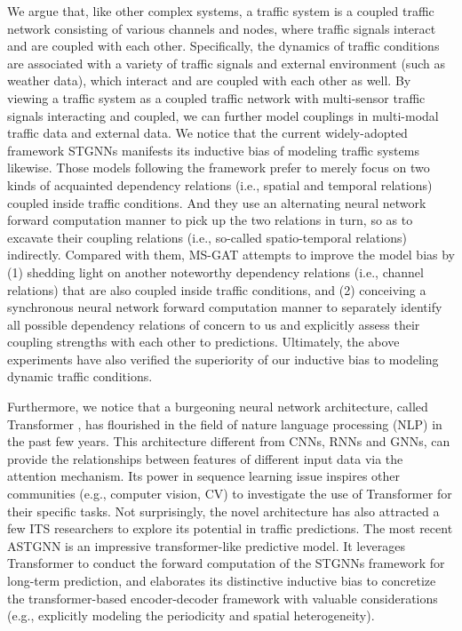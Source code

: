We argue that, like other complex systems, a traffic system is a coupled traffic network consisting of various channels and nodes, where traffic signals interact and are coupled with each other. Specifically, the dynamics of traffic conditions are associated with a variety of traffic signals and external environment (such as weather data), which interact and are coupled with each other as well. By viewing a traffic system as a coupled traffic network with multi-sensor traffic signals interacting and coupled, we can further model couplings in multi-modal traffic data and external data. We notice that the current widely-adopted framework STGNNs manifests its inductive bias of modeling traffic systems likewise. Those models following the framework prefer to merely focus on two kinds of acquainted dependency relations (i.e., spatial and temporal relations) coupled inside traffic conditions. And they use an alternating neural network forward computation manner to pick up the two relations in turn, so as to excavate their coupling relations (i.e., so-called spatio-temporal relations) indirectly. Compared with them, MS-GAT attempts to improve the model bias by (1) shedding light on another noteworthy dependency relations (i.e., channel relations) that are also coupled inside traffic conditions, and (2) conceiving a synchronous neural network forward computation manner to separately identify all possible dependency relations of concern to us and explicitly assess their coupling strengths with each other to predictions. Ultimately, the above experiments have also verified the superiority of our inductive bias to modeling dynamic traffic conditions. 

Furthermore, we notice that a burgeoning neural network architecture, called Transformer \cite{vaswani2017attention}, has flourished in the field of nature language processing (NLP) in the past few years. This architecture different from CNNs, RNNs and GNNs, can provide the relationships between features of different input data via the attention mechanism. Its power in sequence learning issue inspires other communities (e.g., computer vision, CV) to investigate the use of Transformer for their specific tasks. Not surprisingly, the novel architecture has also attracted a few ITS researchers to explore its potential in traffic predictions. The most recent ASTGNN \cite{2021Learning} is an impressive transformer-like predictive model. It leverages Transformer to conduct the forward computation of the STGNNs framework for long-term prediction, and elaborates its distinctive inductive bias to concretize the transformer-based encoder-decoder framework with valuable considerations (e.g., explicitly modeling the periodicity and spatial heterogeneity). 


